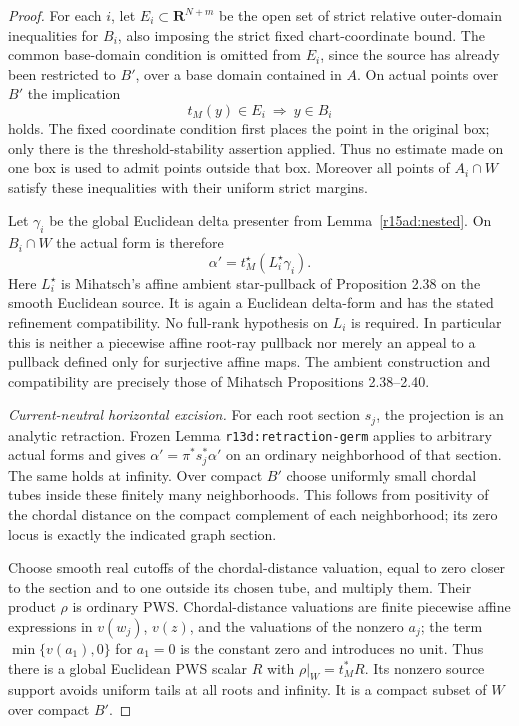 \begin{proof}
For each $i$, let $E_i\subset\mathbf R^{N+m}$ be
the open set of strict relative outer-domain inequalities
for $B_i$, also imposing the strict fixed chart-coordinate
bound.  The common base-domain condition is omitted
from $E_i$, since the source has already been restricted
to $B'$, over a base domain contained in $A$.
On actual points over $B'$ the implication
\[
                          t_M(y)\in E_i\ \Longrightarrow\ y\in B_i
\tag{AD15.4}\label{r15ad:domain-implication}
\]
holds.  The fixed coordinate condition first places
the point in the original box; only there is the
threshold-stability assertion applied.  Thus no estimate
made on one box is used to admit points outside that box.
Moreover all points of $A_i\cap W$ satisfy these
inequalities with their uniform strict margins.

Let $\gamma_i$ be the global Euclidean delta presenter
from Lemma~\ref{r15ad:nested}.  On $B_i\cap W$ the
actual form is therefore
\[
                 \alpha'=t_M^\star(L_i^\star\gamma_i).
\tag{AD15.5}\label{r15ad:local-ambient}
\]
Here $L_i^\star$ is Mihatsch's affine ambient star-pullback
of Proposition 2.38 on the smooth Euclidean source.
It is again a Euclidean delta-form and has the stated
refinement compatibility.  No full-rank hypothesis on
$L_i$ is required.  In particular this is neither a
piecewise affine root-ray pullback nor merely an appeal
to a pullback defined only for surjective affine maps.
The ambient construction and compatibility are precisely
those of Mihatsch Propositions 2.38--2.40.

\emph{Current-neutral horizontal excision.}
For each root section $s_j$, the projection is an
analytic retraction.  Frozen Lemma
\texttt{r13d:retraction-germ} applies to arbitrary
actual forms and gives
$\alpha'=\pi^*s_j^*\alpha'$ on an ordinary neighborhood
of that section.  The same holds at infinity.  Over
compact $B'$ choose uniformly small chordal tubes
inside these finitely many neighborhoods.  This follows
from positivity of the chordal distance on the compact
complement of each neighborhood; its zero locus is
exactly the indicated graph section.

Choose smooth real cutoffs of the chordal-distance
valuation, equal to zero closer to the section and
to one outside its chosen tube, and multiply them.
Their product $\rho$ is ordinary PWS.  Chordal-distance
valuations are finite piecewise affine expressions in
$v(w_j)$, $v(z)$, and the valuations of the nonzero
$a_j$; the term $\min\{v(a_1),0\}$ for $a_1=0$
is the constant zero and introduces no unit.  Thus there is a global
Euclidean PWS scalar $R$ with $\rho|_W=t_M^*R$.
Its nonzero source support avoids uniform tails at all
roots and infinity.  It is a compact subset of $W$
over compact $B'$.


\end{proof}
